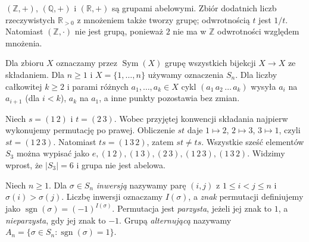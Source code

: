 \begin{przyklad}
\label{aa:prz:liczbowe}
$(\mathbb Z,+)$, $(\mathbb Q,+)$ i $(\mathbb R,+)$ są grupami
abelowymi. Zbiór dodatnich liczb rzeczywistych $\mathbb R_{>0}$
z mnożeniem także tworzy grupę; odwrotnością $t$ jest $1/t$.
Natomiast $(\mathbb Z,\cdot)$ nie jest grupą, ponieważ $2$
nie ma w $\mathbb Z$ odwrotności względem mnożenia.
\end{przyklad}

\begin{definicja}
Dla zbioru $X$ oznaczamy przez $\operatorname{Sym}(X)$ grupę
wszystkich bijekcji $X\to X$ ze składaniem. Dla $n\ge1$ i
$X=\{1,\ldots,n\}$ używamy oznaczenia $S_n$.
Dla liczby całkowitej $k\ge2$ i parami różnych $a_1,\ldots,a_k\in X$
cykl $(a_1\,a_2\,\ldots\,a_k)$ wysyła $a_i$ na $a_{i+1}$
(dla $i<k$), $a_k$ na $a_1$, a inne punkty pozostawia bez zmian.
\end{definicja}

\begin{przyklad}[Nieprzemienność w $S_3$]
\label{aa:prz:s3}
Niech $s=(1\,2)$ i $t=(2\,3)$. Wobec przyjętej konwencji
składania najpierw wykonujemy permutację po prawej.
Obliczenie $st$ daje $1\mapsto2$, $2\mapsto3$,
$3\mapsto1$, czyli $st=(1\,2\,3)$. Natomiast
$ts=(1\,3\,2)$, zatem $st\ne ts$.
Wszystkie sześć elementów $S_3$ można wypisać jako
$e,(1\,2),(1\,3),(2\,3),(1\,2\,3),(1\,3\,2)$.
Widzimy wprost, że $|S_3|=6$ i grupa nie jest abelowa.
\end{przyklad}

\begin{definicja}
\label{aa:def:alternujaca}
Niech $n\ge1$. Dla $\sigma\in S_n$ \emph{inwersją} nazywamy parę
$(i,j)$ z $1\le i<j\le n$ i $\sigma(i)>\sigma(j)$.
Liczbę inwersji oznaczamy $I(\sigma)$, a \emph{znak} permutacji
definiujemy jako $\operatorname{sgn}(\sigma)=(-1)^{I(\sigma)}$.
Permutacja jest \emph{parzysta}, jeżeli jej znak to $1$,
a \emph{nieparzysta}, gdy jej znak to $-1$.
Grupą \emph{alternującą} nazywamy
$A_n=\{\sigma\in S_n:\operatorname{sgn}(\sigma)=1\}$.
\end{definicja}

